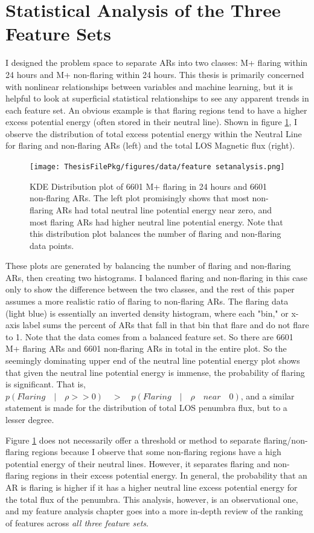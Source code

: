 \section{Statistical Analysis of the Three Feature Sets}
I designed the problem space to separate ARs into two classes: M+ flaring within 24 hours and M+ non-flaring within 24 hours. This thesis is primarily concerned with nonlinear relationships between variables and machine learning, but it is helpful to look at superficial statistical relationships to see any apparent trends in each feature set. An obvious example is that flaring regions tend to have a higher excess potential energy (often stored in their neutral line). Shown in figure \ref{fig:nlphi}, I observe the distribution of total excess potential energy within the Neutral Line for flaring and non-flaring ARs (left) and the total LOS Magnetic flux (right).
\begin{figure}[h]
    \centering
    \texttt{[image: ThesisFilePkg/figures/data/feature setanalysis.png]}
    \caption{KDE Distribution plot of 6601 M+ flaring in 24 hours and 6601 non-flaring ARs. The left plot promisingly shows that most non-flaring ARs had total neutral line potential energy near zero, and most flaring ARs had higher neutral line potential energy. Note that this distribution plot balances the number of flaring and non-flaring data points.}
    \label{fig:nlphi}
\end{figure}
These plots are generated by balancing the number of flaring and non-flaring ARs, then creating two histograms. I balanced flaring and non-flaring in this case only to show the difference between the two classes, and the rest of this paper assumes a more realistic ratio of flaring to non-flaring ARs. The flaring data (light blue) is essentially an inverted density histogram, where each "bin," or x-axis label sums the percent of ARs that fall in that bin that flare and do not flare to 1. Note that the data comes from a balanced feature set. So there are 6601 M+ flaring ARs and 6601 non-flaring ARs in total in the entire plot. So the seemingly dominating upper end of the neutral line potential energy plot shows that given the neutral line potential energy is immense, the probability of flaring is significant. That is, $p(Flaring \quad | \quad \rho >> 0) \quad > \quad p(Flaring \quad | \quad \rho \quad near \quad 0)$, and a similar statement is made for the distribution of total LOS penumbra flux, but to a lesser degree.

Figure \ref{fig:nlphi} does not necessarily offer a threshold or method to separate flaring/non-flaring regions because I observe that some non-flaring regions have a high potential energy of their neutral lines. However, it separates flaring and non-flaring regions in their excess potential energy. In general, the probability that an AR is flaring is higher if it has a higher neutral line excess potential energy for the total flux of the penumbra. This analysis, however, is an observational one, and my feature analysis chapter goes into a more in-depth review of the ranking of features across \textit{all three feature sets}.

